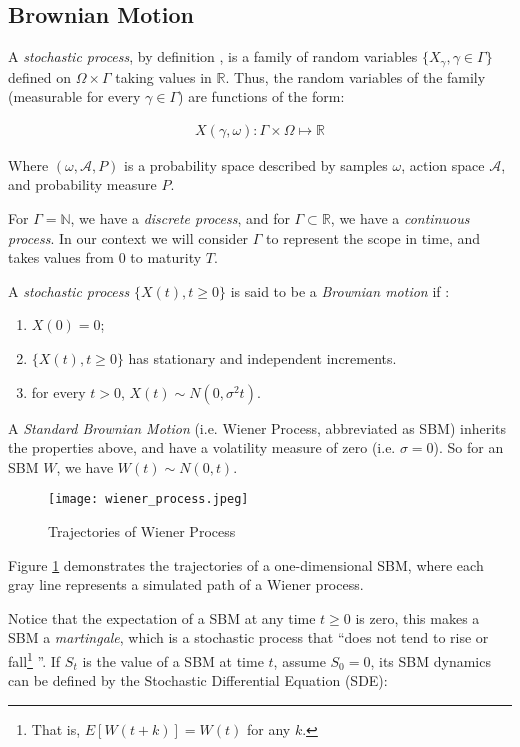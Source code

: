 \subsection{Brownian Motion}

A \textit{stochastic process}, by definition \cite{Iacus2008}, is a family of random variables $\{X_\gamma,\gamma\in\Gamma\}$ defined on $\Omega\times\Gamma$ taking values in $\mathbb{R}$. Thus, the random variables of the family (measurable for every $\gamma\in\Gamma$) are functions of the form:

\begin{align*}
X(\gamma,\omega):\Gamma\times\Omega\mapsto\mathbb{R}
\end{align*}

Where $(\omega,\mathcal{A},P)$ is a probability space described by samples $\omega$, action space $\mathcal{A}$, and probability measure $P$.

For $\Gamma=\mathbb{N}$, we have a \textit{discrete process}, and for $\Gamma\subset\mathbb{R}$, we have a \textit{continuous process}. In our context we will consider $\Gamma$ to represent the scope in time, and takes values from $0$ to maturity $T$.

A \textit{stochastic process} $\{X(t), t\geq 0\}$ is said to be a \textit{Brownian motion} if \cite{Iacus2008}:

\begin{enumerate}
	\item $X(0)=0$;
	\item $\{X(t),t\geq0\}$ has stationary and independent increments.
	\item for every $t>0$, $X(t)\sim N(0,\sigma^2 t)$.
\end{enumerate}

A \textit{Standard Brownian Motion} (i.e. Wiener Process, abbreviated as SBM) inherits the properties above, and have a volatility measure of zero (i.e. $\sigma=0$). So for an SBM $W$, we have $W(t) \sim N(0,t)$.

\begin{figure}[H]
	\centering
	\texttt{[image: wiener\_process.jpeg]}
	\caption{Trajectories of Wiener Process} \label{img:wiener_process}
\end{figure}

Figure \ref{img:wiener_process} demonstrates the trajectories of a one-dimensional SBM, where each gray line represents a simulated path of a Wiener process.

Notice that the expectation of a SBM at any time $t\geq0$ is zero, this makes a SBM a \textit{martingale}, which is a stochastic process that ``does not tend to rise or fall\footnote{That is, $E[W(t+k)]=W(t)$ for any $k$.} \cite{Shreve2004}''. If $S_t$ is the value of a SBM at time $t$, assume $S_0=0$, its SBM dynamics can be defined by the Stochastic Differential Equation (SDE):

